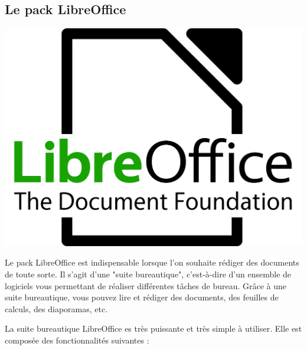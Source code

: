 \documentclass[12pt]{book}
\begin{document}
	\subsection{Le pack LibreOffice}\label{sec:libreoffice}
		\hspace{-.8cm}
		\begin{minipage}[c]{0.3\textwidth}
			\centering
			\includegraphics[width=\textwidth]{include/lo_logo.png}
		\end{minipage}
		\begin{minipage}[c]{.65\textwidth}
			\hspace{.4cm}
			Le pack LibreOffice est indispensable lorsque l'on souhaite rédiger des documents de toute sorte.
			Il s'agit d'une "suite bureautique", c'est-à-dire d'un ensemble de logiciels vous permettant de réaliser différentes tâches de bureau.
			Grâce à une suite bureautique, vous pouvez lire et rédiger des documents, des feuilles de calculs, des diaporamas, etc.
		\end{minipage}\par
			La suite bureautique LibreOffice es très puissante et très simple à utiliser.
			Elle est composée des fonctionnalités suivantes :
\end{document}

